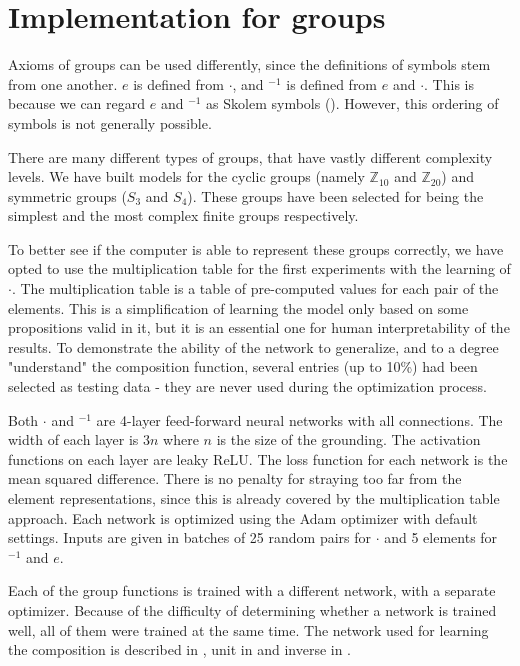 \section{Implementation for groups}
\label{section:group_impl}
Axioms of groups can be used differently, since the definitions of symbols stem from one another. $e$ is defined from $\cdot$, and $^{-1}$ is defined from $e$ and $\cdot$. This is because we can regard $e$ and $^{-1}$ as Skolem symbols (). However, this ordering of symbols is not generally possible.

There are many different types of groups, that have vastly different complexity levels. We have built models for the cyclic groups (namely $\mathbb{Z}_{10}$ and $\mathbb{Z}_{20}$) and symmetric groups ($S_3$ and $S_4$). These groups have been selected for being the simplest and the most complex finite groups respectively.

To better see if the computer is able to represent these groups correctly, we have opted to use the multiplication table for the first experiments with the learning of $\cdot$. The multiplication table is a table of pre-computed values for each pair of the elements. This is a simplification of learning the model only based on some propositions valid in it, but it is an essential one for human interpretability of the results. To demonstrate the ability of the network to generalize, and to a degree "understand" the composition function, several entries (up to 10\%) had been selected as testing data - they are never used during the optimization process.

Both $\cdot$ and $^{-1}$ are 4-layer feed-forward neural networks with all connections. The width of each layer is $3n$ where $n$ is the size of the grounding. The activation functions on each layer are leaky ReLU. The loss function for each network is the mean squared difference. There is no penalty for straying too far from the element representations, since this is already covered by the multiplication table approach. Each network is optimized using the Adam optimizer with default settings. Inputs are given in batches of 25 random pairs for $\cdot$ and 5 elements for $^{-1}$ and $e$. 

Each of the group functions is trained with a different network, with a separate optimizer. Because of the difficulty of determining whether a network is trained well, all of them were trained at the same time. The network used for learning the composition is described in , unit in  and inverse in . 

